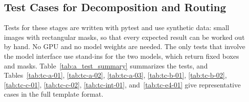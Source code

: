 \documentclass{FastFyp}
\begin{document}
\subsection{Test Cases for Decomposition and Routing}
Tests for these stages are written with pytest and use synthetic data: small images with rectangular masks, so that every expected result can be worked out by hand. No GPU and no model weights are needed. The only tests that involve the model interface use stand-ins for the two models, which return fixed boxes and masks. Table~\ref{tab:a_test_summary} summarizes the tests, and Tables~\ref{tab:tc-a-01}, \ref{tab:tc-a-02}, \ref{tab:tc-a-03}, \ref{tab:tc-b-01}, \ref{tab:tc-b-02}, \ref{tab:tc-c-01}, \ref{tab:tc-c-02}, \ref{tab:tc-int-01}, and~\ref{tab:tc-e4-01} give representative cases in the full template format.
\end{document}
